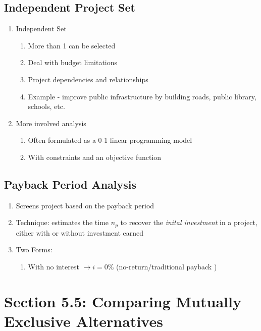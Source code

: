 \documentclass{report} %
\begin{document}
\subsection*{Independent Project Set}
\begin{enumerate}
    \item Independent Set
        \begin{enumerate}
            \item More than 1 can be selected
            \item Deal with budget limitations
            \item Project dependencies and relationships
            \item Example - improve public infrastructure by building roads, public library, schools, etc.
        \end{enumerate}
    \item More involved analysis
        \begin{enumerate}
            \item Often formulated as a 0-1 linear programming model
            \item With constraints and an objective function
        \end{enumerate}
\end{enumerate}
\subsection*{Payback Period Analysis}
\begin{enumerate}
    \item Screens project based on the payback period
    \item Technique: estimates the time $n_p$ to recover the \emph{inital investment} in a project, either with or without investment earned
    \item Two Forms:
        \begin{enumerate}
            \item With no interest $\rightarrow i = 0\%$ (no-return/traditional payback ) 
        \end{enumerate}
\end{enumerate}



\section*{Section 5.5: Comparing Mutually Exclusive Alternatives}
\end{document}
